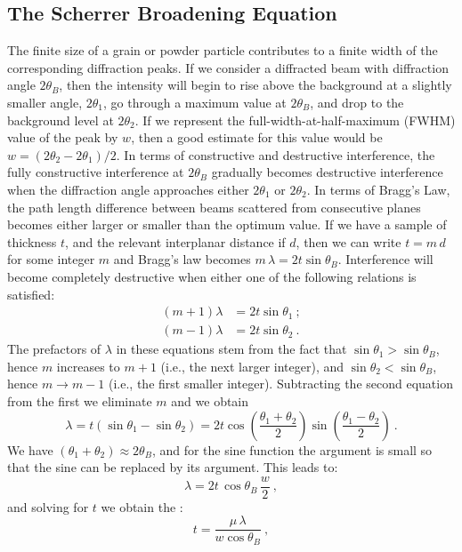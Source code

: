 \subsection{The Scherrer Broadening Equation}\label{\chabbr:ssec:Scherrerbroadening}
The finite size of a grain or powder particle contributes to a finite width of the corresponding diffraction peaks.  If we consider a diffracted beam with diffraction angle $2\theta_B$, then the intensity will begin to rise above the background at a slightly smaller angle, $2\theta_1$, go through a maximum value at $2\theta_B$, and drop to the background level at $2\theta_2$.  If we represent the full-width-at-half-maximum (FWHM) value of the peak by $w$, then a good estimate for this value would be $w=(2\theta_2-2\theta_1)/2$.  In terms of constructive and destructive interference, the fully constructive interference at $2\theta_B$ gradually becomes destructive interference when the diffraction angle approaches either $2\theta_1$ or $2\theta_2$.  In terms of Bragg's Law, the path length difference between beams scattered from consecutive planes becomes either larger or smaller than the optimum value. If we have a sample of thickness $t$, and the relevant interplanar distance if $d$, then we can write $t=m\,d$ for some integer $m$ and Bragg's law becomes $m\,\lambda=2t\sin\theta_B$.  Interference will become completely destructive when either one of the following relations is satisfied:
\begin{equation*}
\begin{split}
	(m+1)\lambda &= 2t\sin\theta_1\ ;\\
	(m-1)\lambda &= 2t\sin\theta_2\ .
\end{split}
\end{equation*}
The prefactors of $\lambda$ in these equations stem from the fact that $\sin\theta_1 > \sin\theta_B$, hence $m$ increases to $m+1$ (i.e., the next larger integer), and $\sin\theta_2 < \sin\theta_B$, hence $m\rightarrow m-1$ (i.e., the first smaller integer).  Subtracting the second equation from the first we eliminate $m$ and we obtain
\[
	\lambda = t(\sin\theta_1-\sin\theta_2) = 2t \cos\left(\frac{\theta_1+\theta_2}{2}\right)\sin\left(\frac{\theta_1-\theta_2}{2}\right)\ .
\]
We have $(\theta_1+\theta_2)\approx2\theta_B$, and for the sine function the argument is small so that the sine can be replaced by its argument. This leads to:
\[
	\lambda = 2t\,\cos\theta_B\,\frac{w}{2}\ ,
\]
and solving for $t$ we obtain the :
\begin{equation}
	t = \frac{\mu\,\lambda}{w\cos\theta_B}\ ,\label{\chabbr:eq:SBE}
\end{equation}
